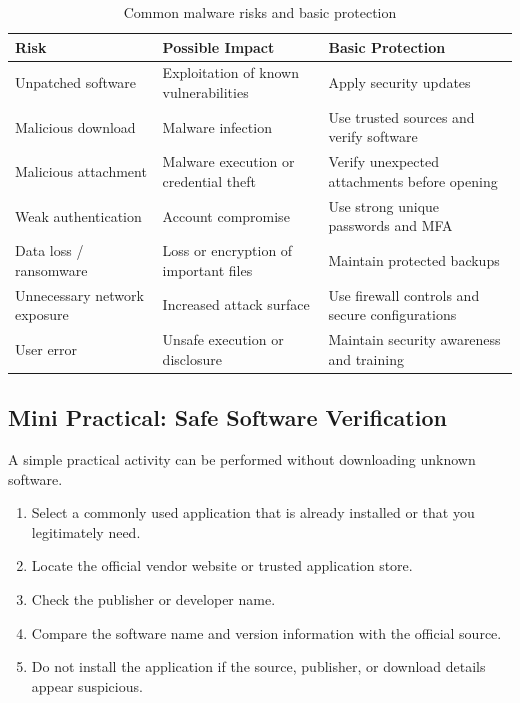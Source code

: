 \documentclass[12pt,a4paper]{article}
\begin{document}
\begin{table}[H]
\centering
\small
\renewcommand{\arraystretch}{1.35}
\begin{tabular}{|p{4.0cm}|p{4.5cm}|p{4.5cm}|}
\hline
\textbf{Risk} & \textbf{Possible Impact} & \textbf{Basic Protection}\\
\hline
Unpatched software & Exploitation of known vulnerabilities & Apply security updates\\
\hline
Malicious download & Malware infection & Use trusted sources and verify software\\
\hline
Malicious attachment & Malware execution or credential theft & Verify unexpected attachments before opening\\
\hline
Weak authentication & Account compromise & Use strong unique passwords and MFA\\
\hline
Data loss / ransomware & Loss or encryption of important files & Maintain protected backups\\
\hline
Unnecessary network exposure & Increased attack surface & Use firewall controls and secure configurations\\
\hline
User error & Unsafe execution or disclosure & Maintain security awareness and training\\
\hline
\end{tabular}
\caption{Common malware risks and basic protection}
\label{tab:malware-risks}
\end{table}

\subsection{Mini Practical: Safe Software Verification}

A simple practical activity can be performed without downloading
unknown software.

\begin{enumerate}
    \item Select a commonly used application that is already installed or that you legitimately need.
    \item Locate the official vendor website or trusted application store.
    \item Check the publisher or developer name.
    \item Compare the software name and version information with the official source.
    \item Do not install the application if the source, publisher, or download details appear suspicious.
\end{enumerate}
\end{document}
